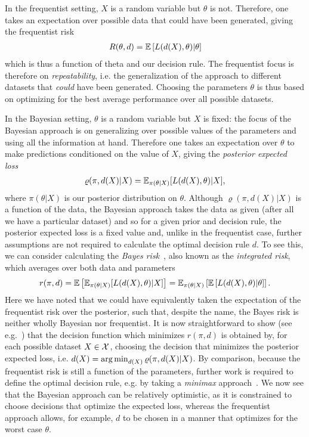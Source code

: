 In the
frequentist setting, $X$ is a random variable but $\theta$ is not.  Therefore, one takes an expectation over possible data
that could have been generated, giving the frequentist risk~\citep{vapnik1998statistical}
\begin{align}
\label{eq:bayes:freq-risk}
R(\theta,d)  = \mathbb{E}\left[L(d(X),\theta) | \theta \right]
\end{align}
which is thus a function of theta and our decision rule.
The frequentist focus is therefore on \emph{repeatability}, i.e.
the generalization of the approach to different datasets that \emph{could} have been generated.
Choosing the parameters $\theta$ is thus based on optimizing for the best average performance over all possible datasets.

In the Bayesian setting, $\theta$ is a random variable but $X$ is fixed: the focus of the Bayesian approach 
is on generalizing over possible values of
the parameters and using all the information at hand.  Therefore one takes an expectation over $\theta$
to make predictions conditioned on the value of $X$, giving the \emph{posterior expected loss}~\citep{robert2007bayesian}
\begin{align}
\label{eq:bayes:bayes-est}
\varrho(\pi,d(X) | X) = \mathbb{E}_{\pi(\theta | X)} [L(d(X),\theta) | X],
\end{align}
where $\pi(\theta | X)$ is our posterior distribution on $\theta$.  Although $\varrho(\pi,d(X) | X)$ 
is a function of the data, the Bayesian
approach takes the data as given (after all we have a particular dataset) and so for a given prior and decision rule, the posterior
expected loss is a fixed value and, unlike in the frequentist case, further assumptions are not required to
calculate the optimal decision rule $d$.  To see this, we can consider calculating the 
\emph{Bayes risk}~\citep{robert2007bayesian}, 
also known as the \emph{integrated risk}, which averages over both data and parameters
\begin{align}
	\label{eq:bayes:bayes-risk}
r(\pi,d) = \mathbb{E} \left[\mathbb{E}_{\pi(\theta | X)} [L(d(X),\theta) | X]\right] = 
\mathbb{E}_{\pi(\theta | X)} \left[\mathbb{E}\left[L(d(X),\theta) | \theta \right] \right].
\end{align}
Here we have noted that we could have equivalently taken the expectation of the frequentist
risk over the posterior, such that, despite the name, the Bayes risk is neither wholly Bayesian
nor frequentist.  It is now straightforward to show (see e.g.~\citep{robert2007bayesian}) that the
decision function which minimizes $r(\pi,d)$ is obtained by, for each possible dataset $X\in\mathcal{X}$,
choosing the decision that minimizes the posterior expected loss, i.e. $d(X) = \operatorname*{arg\,min}_{d(X)} \varrho(\pi,d(X) | X)$.
By comparison, because the frequentist risk is still a function of the parameters,
 further work is required to define the optimal decision rule, e.g. by taking a \emph{minimax}
approach~\citep{vapnik1998statistical}.
We now see that the Bayesian approach can be relatively optimistic, as it is constrained to choose
decisions that optimize the expected loss,
whereas the frequentist approach allows, for example, $d$ to be chosen in a manner that
optimizes for the worst case $\theta$.

